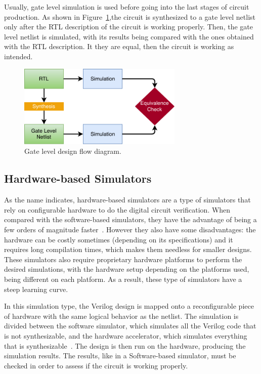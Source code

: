 Usually, gate level simulation is used before going into the last stages of
circuit production. As shown in Figure~\ref{fig:gl},the circuit is synthesized
to a gate level netlist only after the RTL description of the circuit is working
properly. Then, the gate level netlist is simulated, with its results being
compared with the ones obtained with the RTL description. It they are equal,
then the circuit is working as intended.

\begin{figure}[!htb]
	\centering
	\includegraphics[width=0.7\textwidth]{Figures/Gate-level.pdf}
	\caption{Gate level design flow diagram.}
	\label{fig:gl}
\end{figure}

\subsection{Hardware-based Simulators}
\label{subsection:hardware}

As the name indicates, hardware-based simulators are a type of simulators that
rely on configurable hardware to do the digital circuit verification. When
compared with the software-based simulators, they have the advantage of being a
few orders of magnitude faster~\cite{tan:vhstas}. However they also have some
disadvantages: the hardware can be costly sometimes (depending on its
specifications) and it requires long compilation times, which makes them
needless for smaller designs. These simulators also require proprietary hardware
platforms to perform the desired simulations, with the hardware setup depending
on the platforms used, being different on each platform. As a result, these type
of simulators have a steep learning curve.

In this simulation type, the Verilog design is mapped onto a reconfigurable
piece of hardware with the same logical behavior as the netlist.  The simulation
is divided between the software simulator, which simulates all the Verilog code
that is not synthesizable, and the hardware accelerator, which simulates
everything that is synthesizable~\cite{khandelwal:gatelevel}. The design is then
run on the hardware, producing the simulation results. The results, like in a
Software-based simulator, must be checked in order to assess if the circuit is
working properly.

